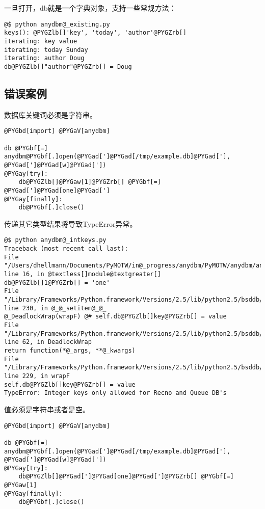\documentclass[letterpaper,10pt,english]{manual}
\begin{document}
一旦打开，db就是一个字典对象，支持一些常规方法：

\begin{Verbatim}[commandchars=@\[\]]
@$ python anydbm@_existing.py
keys(): @PYGZlb[]'key', 'today', 'author'@PYGZrb[]
iterating: key value
iterating: today Sunday
iterating: author Doug
db@PYGZlb[]"author"@PYGZrb[] = Doug
\end{Verbatim}


\subsection{错误案例}

数据库关键词必须是字符串。

\begin{Verbatim}[commandchars=@\[\]]
@PYGbd[import] @PYGaV[anydbm]

db @PYGbf[=] anydbm@PYGbf[.]open(@PYGad[']@PYGad[/tmp/example.db]@PYGad['], @PYGad[']@PYGad[w]@PYGad['])
@PYGay[try]:
    db@PYGZlb[]@PYGaw[1]@PYGZrb[] @PYGbf[=] @PYGad[']@PYGad[one]@PYGad[']
@PYGay[finally]:
    db@PYGbf[.]close()
\end{Verbatim}

传递其它类型结果将导致TypeError异常。

\begin{Verbatim}[commandchars=@\[\]]
@$ python anydbm@_intkeys.py
Traceback (most recent call last):
File "/Users/dhellmann/Documents/PyMOTW/in@_progress/anydbm/PyMOTW/anydbm/anydbm@_intkeys.py", line 16, in @textless[]module@textgreater[]
db@PYGZlb[]1@PYGZrb[] = 'one'
File "/Library/Frameworks/Python.framework/Versions/2.5/lib/python2.5/bsddb/@_@_init@_@_.py", line 230, in @_@_setitem@_@_
@_DeadlockWrap(wrapF) @# self.db@PYGZlb[]key@PYGZrb[] = value
File "/Library/Frameworks/Python.framework/Versions/2.5/lib/python2.5/bsddb/dbutils.py", line 62, in DeadlockWrap
return function(*@_args, **@_kwargs)
File "/Library/Frameworks/Python.framework/Versions/2.5/lib/python2.5/bsddb/@_@_init@_@_.py", line 229, in wrapF
self.db@PYGZlb[]key@PYGZrb[] = value
TypeError: Integer keys only allowed for Recno and Queue DB's
\end{Verbatim}

值必须是字符串或者是空。

\begin{Verbatim}[commandchars=@\[\]]
@PYGbd[import] @PYGaV[anydbm]

db @PYGbf[=] anydbm@PYGbf[.]open(@PYGad[']@PYGad[/tmp/example.db]@PYGad['], @PYGad[']@PYGad[w]@PYGad['])
@PYGay[try]:
    db@PYGZlb[]@PYGad[']@PYGad[one]@PYGad[']@PYGZrb[] @PYGbf[=] @PYGaw[1]
@PYGay[finally]:
    db@PYGbf[.]close()
\end{Verbatim}
\end{document}
